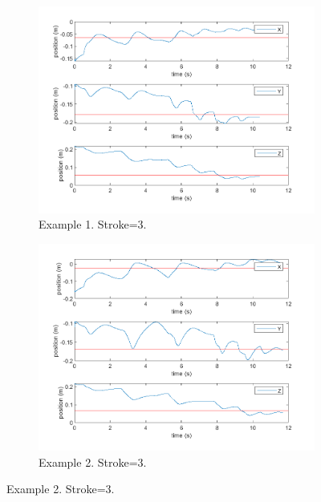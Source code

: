 \begin{figure}[ht]
    \centering
    \begin{subfigure}[b]{0.45\textwidth}
        \centering
        \includegraphics[width=\linewidth]{Pictures/Results/Controller/Stroke3/6.png}
        \caption{Example 1. Stroke=3.}
    \end{subfigure}%
    \hfill
    \begin{subfigure}[b]{0.45\textwidth}
        \centering
        \includegraphics[width=\linewidth]{Pictures/Results/Controller/Stroke3/20.png}
        \caption{Example 2. Stroke=3.}
    \end{subfigure}
    

\end{figure}
